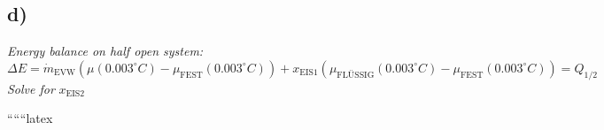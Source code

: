 

\subsection*{d)}
\textit{Energy balance on half open system:}
\begin{equation*}
    \Delta E = \dot{m}_{\text{EVW}} \left( \mu(0.003^\circ C) - \mu_{\text{FEST}} (0.003^\circ C) \right) + x_{\text{EIS1}} \left( \mu_{\text{FLÜSSIG}} (0.003^\circ C) - \mu_{\text{FEST}} (0.003^\circ C) \right) = Q_{1/2}
\end{equation*}
\textit{Solve for } $x_{\text{EIS2}}$

``````latex